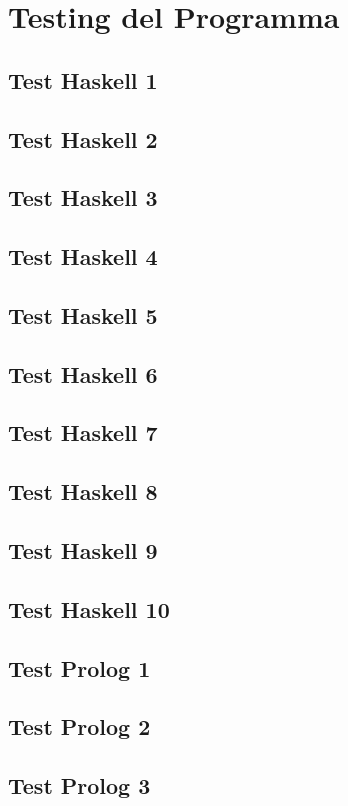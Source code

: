 \documentclass{article}
\begin{document}
\section{Testing del Programma}
\subsection*{Test Haskell 1}
\subsection*{Test Haskell 2}
\subsection*{Test Haskell 3}
\subsection*{Test Haskell 4}
\subsection*{Test Haskell 5}
\subsection*{Test Haskell 6}
\subsection*{Test Haskell 7}
\subsection*{Test Haskell 8}
\subsection*{Test Haskell 9}
\subsection*{Test Haskell 10}
\newpage
\subsection*{Test Prolog 1}
\subsection*{Test Prolog 2}
\subsection*{Test Prolog 3}
\end{document}
